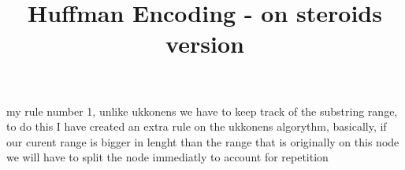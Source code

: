 \documentclass[12pt]{article}
\begin{document}
\title{Huffman Encoding - on steroids version}
\maketitle





my rule number 1, unlike ukkonens we have to keep track of the substring
range, to do this I have created an extra rule on the ukkonens algorythm, basically, if our curent range is bigger in lenght than the range that is 
originally on this node we will have to split the node immediatly to account for repetition
\end{document}

